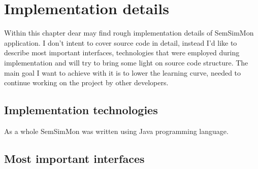  
%


\chapter{Implementation details}
\label{cha:implementation}

Within this chapter dear may find rough implementation details of SemSimMon application. I don't intent to cover
source code in detail, instead I'd like to describe most important interfaces, technologies that were employed during 
implementation and will try to bring some light on source code structure. The main goal I want to achieve with it is to 
lower the learning curve, needed to continue working on the project by other developers.


\section{Implementation technologies}

As a whole SemSimMon was written using Java programming language. 


\section{Most important interfaces}


